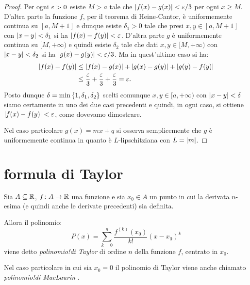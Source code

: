 \begin{proof}
Per ogni $\varepsilon>0$ esiste $M>a$ tale che ${\left|f(x)-g(x)\right|} < \varepsilon/3$ per ogni $x\ge M$. D'altra parte la funzione $f$, per il teorema di Heine-Cantor, è uniformemente continua su $[a,M+1]$ e dunque esiste $\delta_1>0$ tale che presi $x,y \in [a,M+1]$ con ${\left|x-y\right|}< \delta_1$
si ha ${\left|f(x)-f(y)\right|} < \varepsilon$. D'altra parte $g$ è uniformemente continua su $[M,+\infty)$ e quindi esiste $\delta_2$ tale che dati $x,y\in [M,+\infty)$ con ${\left|x-y\right|} < \delta_2$ si ha ${\left|g(x)-g(y)\right|} < \varepsilon/3$. Ma in quest'ultimo caso si ha:
\begin{align*}
  {\left|f(x)-f(y)\right|} &\le {\left|f(x) - g(x)\right|} + {\left|g(x) - g(y)\right|} + {\left|g(y)-f(y)\right|} \\
  & \le \frac{\varepsilon}{3} + \frac{\varepsilon}{3} + \frac{\varepsilon}{3} = \varepsilon.
\end{align*}
Posto dunque $\delta = \min{\left\{ 1, \delta_1, \delta_2 \right\}}$
scelti comunque $x,y\in [a,+\infty)$ con ${\left|x-y\right|}< \delta$ siamo certamente in uno dei due casi precedenti e quindi, in ogni caso, si ottiene ${\left|f(x)-f(y)\right|} < \varepsilon$, come dovevamo dimostrare.

Nel caso particolare $g(x) = mx +q$ si osserva semplicemente che $g$ è uniformemente continua in quanto è $L$-lipschitziana con $L={\left|m\right|}$.
\end{proof}


\section{formula di Taylor}


\begin{definition}
\mymark{***}
Sia $A\subseteq {\mathbb R}$, $f\colon A \to {\mathbb R}$ una funzione
e sia $x_0\in A$ un punto in cui la derivata $n$-esima
(e quindi anche le derivate precedenti) sia definita.

Allora il polinomio:
\[
  P(x) = \sum_{k=0}^n \frac{f^{(k)}(x_0)}{k!}(x-x_0)^k
\]
viene detto \emph{polinomio!di Taylor}%
%
di ordine $n$
della funzione $f$,
centrato in $x_0$.
\end{definition}

Nel caso particolare in cui sia $x_0=0$ il polinomio di Taylor viene anche chiamato \emph{polinomio!di MacLaurin}%
%
.

